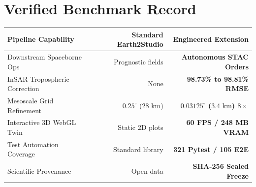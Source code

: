 \documentclass[10pt,letterpaper]{article}
\begin{document}
\begin{minipage}[t]{0.51\textwidth}
    \section*{Verified Benchmark Record}
    \footnotesize
    \begin{tabularx}{\linewidth}{X r r}
        \toprule
        \textbf{Pipeline Capability} & \textbf{Standard Earth2Studio} & \textbf{Engineered Extension} \\
        \midrule
        Downstream Spaceborne Ops & Prognostic fields & \textbf{Autonomous STAC Orders} \\
        InSAR Tropospheric Correction & None & \textbf{98.73\% to 98.81\% RMSE} \\
        Mesoscale Grid Refinement & $0.25^\circ$ ($28\text{ km}$) & \textbf{$0.03125^\circ$ ($3.4\text{ km}$) $8\times$} \\
        Interactive 3D WebGL Twin & Static 2D plots & \textbf{60 FPS / 248 MB VRAM} \\
        Test Automation Coverage & Standard library & \textbf{321 Pytest / 105 E2E} \\
        Scientific Provenance & Open data & \textbf{SHA-256 Sealed Freeze} \\
        \bottomrule
    \end{tabularx}
\end{minipage}
\hfill
\end{document}
